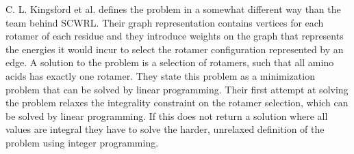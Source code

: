 C. L. Kingsford et al. \cite{kingsford2005solving} defines the problem
in a somewhat different way than the team behind SCWRL. Their graph
representation contains vertices for each rotamer of each residue and
they introduce weights on the graph that represents the energies it
would incur to select the rotamer configuration represented by an
edge. A solution to the problem is a selection of rotamers, such that
all amino acids has exactly one rotamer. They state this problem as a minimization
problem that can be solved by linear programming. Their first attempt
at solving the problem relaxes the integrality constraint on the
rotamer selection, which can be solved by linear programming. If this
does not return a solution where all values are integral they have to
solve the harder, unrelaxed definition of the problem using integer
programming.

